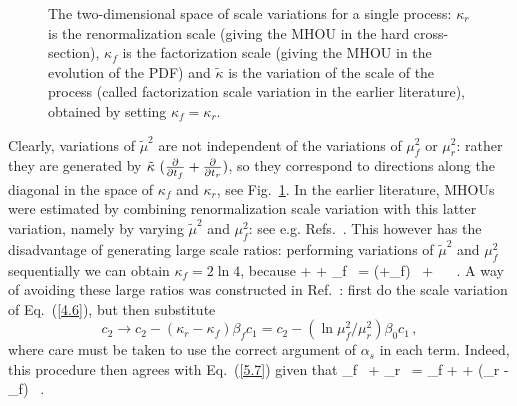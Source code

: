 \begin{figure}[b!]
\centering
{}
\caption{The two-dimensional space of scale variations for a single
  process: $\kappa_r$ is the renormalization scale (giving the MHOU in
  the hard cross-section), $\kappa_f$ is the factorization scale
  (giving the MHOU in the evolution of the PDF) and $\tilde\kappa$ is
  the variation of the scale of the process (called factorization
  scale variation in the earlier literature), obtained by setting
  $\kappa_f=\kappa_r$. \label{fig:DoubleScaleVar1}} 
\end{figure}

Clearly, variations of $\tilde\mu^2$ are not independent of the
variations of $\mu_f^2$ or $\mu_r^2$: rather they are generated by
$\tilde\kappa\ (\smallfrac{\partial}{\partial t_f} +
\smallfrac{\partial}{\partial t _r})$, so they correspond to directions along
the diagonal in the space of $\kappa_f$ and $\kappa_r$, see Fig.~\ref{fig:DoubleScaleVar1}.
%
In the earlier literature, MHOUs were estimated by combining
renormalization scale variation with this latter variation, namely by
varying $\tilde\mu^2$ and
$\mu_f^2$: see e.g.
Refs.~\cite{Martin:1990fq,Virchaux:1991jc}. This however has the
disadvantage of generating large scale ratios:
performing variations of
$\tilde\mu^2$ and $\mu_f^2$ sequentially we can obtain $\kappa_f = 2
\ln 4$, because
\be
\tilde\kappa
\lp {} +  \rp + \kappa_f\  =
(\tilde\kappa+\kappa_f)\  +
\tilde\kappa \  \, .
\ee
A way of
avoiding these large ratios was constructed in
Ref.~\cite{vanNeerven:2000uj}: first do the  scale
variation of Eq.~(\ref{4.6}), but then substitute
\begin{equation}
    c_2  \to c_2 - (\kappa_r - \kappa_f) \beta_f c_1 = c_2 - (\ln \mu_f^2/\mu_r^2) \beta_0 c_1 \, ,
    \label{5.9}
 \end{equation}
where care must  be taken to use the correct argument of $\alpha_s$ in
each term.
%
Indeed, this procedure then agrees with Eq.~(\ref{5.7}) given that
\be
\kappa_f\  +
\kappa_r\  = \kappa_f
 \lp {} + \rp + (\kappa_r  -  \kappa_f) \, .
\ee

